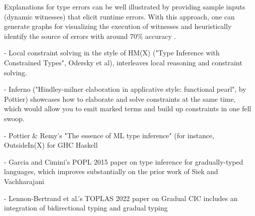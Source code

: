 
Explanations for type errors can be well illustrated by providing sample inputs (dynamic witnesses) that elicit runtime errors. With this approach, one can generate graphs for visualizing the execution of witnesses and heuristically identify the source of errors with around 70\% accuracy \cite{Seidel2016}.

- Local constraint solving in the style of HM(X) ("Type Inference with Constrained Types", Odersky et al), interleaves local reasoning and constraint solving.

- Inferno ("Hindley-milner elaboration in applicative style: functional pearl", by Pottier) showcases how to elaborate and solve constraints at the same time, which would allow you to emit marked terms and build up constraints in one fell swoop.

- Pottier & Remy's "The essence of ML type inference" (for instance, OutsideIn(X) for GHC Haskell

- Garcia and Cimini's POPL 2015 paper on type inference for gradually-typed languages, which improves substantially on the prior work of Siek and Vachharajani

- Lennon-Bertrand et al.'s TOPLAS 2022 paper on Gradual CIC includes an integration of bidirectional typing and gradual typing

